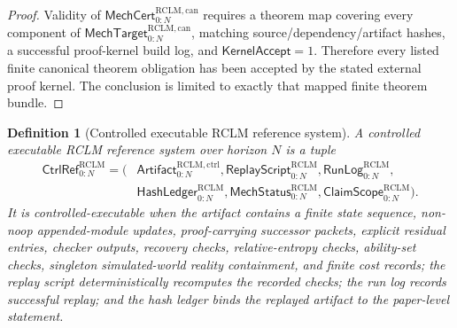 \documentclass[11pt,a4paper]{article}
\newtheorem{definition}[theorem]{Definition}
\newcommand{\RCLM}{\mathrm{RCLM}}
\begin{document}
\begin{proof}
Validity of \(\mathsf{MechCert}_{0:N}^{\RCLM,\mathrm{can}}\) requires a theorem map covering every component of \(\mathsf{MechTarget}_{0:N}^{\RCLM,\mathrm{can}}\), matching source/dependency/artifact hashes, a successful proof-kernel build log, and \(\mathsf{KernelAccept}=1\).  Therefore every listed finite canonical theorem obligation has been accepted by the stated external proof kernel.  The conclusion is limited to exactly that mapped finite theorem bundle.
\end{proof}

\begin{definition}[Controlled executable RCLM reference system]
\label{def:rclm-batch13rB-controlled-reference-system}
A controlled executable RCLM reference system over horizon \(N\) is a tuple
\[
\begin{aligned}
\mathsf{CtrlRef}_{0:N}^{\RCLM}=(&
\mathsf{Artifact}_{0:N}^{\RCLM,\mathrm{ctrl}},
\mathsf{ReplayScript}_{0:N}^{\RCLM},
\mathsf{RunLog}_{0:N}^{\RCLM},\\
&\mathsf{HashLedger}_{0:N}^{\RCLM},
\mathsf{MechStatus}_{0:N}^{\RCLM},
\mathsf{ClaimScope}_{0:N}^{\RCLM}).
\end{aligned}
\]
It is controlled-executable when the artifact contains a finite state sequence, non-noop appended-module updates, proof-carrying successor packets, explicit residual entries, checker outputs, recovery checks, relative-entropy checks, ability-set checks, singleton simulated-world reality containment, and finite cost records; the replay script deterministically recomputes the recorded checks; the run log records successful replay; and the hash ledger binds the replayed artifact to the paper-level statement.
\end{definition}
\end{document}
